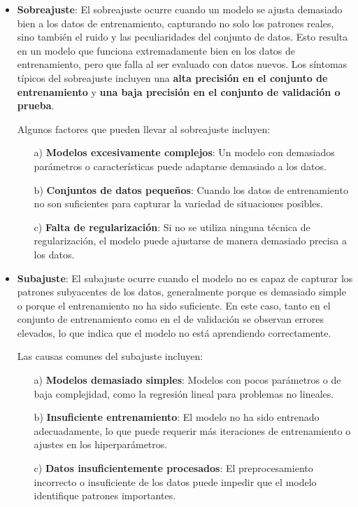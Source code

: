 \documentclass[a4paper]{report} %
\begin{document}
\begin{itemize}

\item \textbf{Sobreajuste}: El sobreajuste ocurre cuando un modelo se ajusta demasiado bien a los datos de entrenamiento, capturando no solo los patrones reales, sino también el ruido y las peculiaridades del conjunto de datos. Esto resulta en un modelo que funciona extremadamente bien en los datos de entrenamiento, pero que falla al ser evaluado con datos nuevos. Los síntomas típicos del sobreajuste incluyen una \textbf{alta precisión en el conjunto de entrenamiento} y \textbf{una baja precisión en el conjunto de validación o prueba}.

Algunos factores que pueden llevar al sobreajuste incluyen:
\begin{itemize} 
\item[a) ] \textbf{Modelos excesivamente complejos}: Un modelo con demasiados parámetros o características puede adaptarse demasiado a los datos. 
\item[b) ] \textbf{Conjuntos de datos pequeños}: Cuando los datos de entrenamiento no son suficientes para capturar la variedad de situaciones posibles.
 \item[c) ] \textbf{Falta de regularización}: Si no se utiliza ninguna técnica de regularización, el modelo puede ajustarse de manera demasiado precisa a los datos. 
 \end{itemize}

\item \textbf{Subajuste}:  El subajuste ocurre cuando el modelo no es capaz de capturar los patrones subyacentes de los datos, generalmente porque es demasiado simple o porque el entrenamiento no ha sido suficiente. En este caso, tanto en el conjunto de entrenamiento como en el de validación se observan errores elevados, lo que indica que el modelo no está aprendiendo correctamente.

Las causas comunes del subajuste incluyen: 
\begin{itemize}
\item[a) ] \textbf{Modelos demasiado simples}: Modelos con pocos parámetros o de baja complejidad, como la regresión lineal para problemas no lineales. 
\item[b) ] \textbf{Insuficiente entrenamiento}: El modelo no ha sido entrenado adecuadamente, lo que puede requerir más iteraciones de entrenamiento o ajustes en los hiperparámetros. 
\item[c) ] \textbf{Datos insuficientemente procesados}: El preprocesamiento incorrecto o insuficiente de los datos puede impedir que el modelo identifique patrones importantes. \end{itemize}
\end{itemize}
\end{document}
